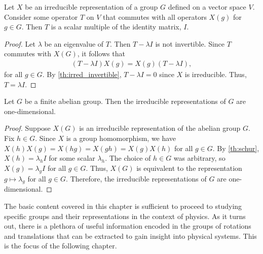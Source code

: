 \begin{lemma}\label{th:schur}
    Let $X$ be an irreducible representation of a group $G$ defined on a vector space $V$. Consider some operator $T$ on $V$ that commutes with all operators $X(g)$ for $g\in G$. Then $T$ is a scalar multiple of the identity matrix, $I$.
\end{lemma}
\begin{proof}
    Let $\lambda$ be an eigenvalue of $T$. Then $T-\lambda I$ is not invertible. Since $T$ commutes with $X(G)$, it follows that
    \begin{align}
        (T-\lambda I)X(g)=X(g)(T-\lambda I),
    \end{align}
    for all $g\in G$. By \cref{th:irred_invertible}, $T-\lambda I = 0$ since $X$ is irreducible. Thus, $T=\lambda I$.
\end{proof}


\begin{theorem}\label{cor:abelian_irred}
    Let $G$ be a finite abelian group. Then the irreducible representations of $G$ are one-dimensional.
\end{theorem}
\begin{proof}
    Suppose $X(G)$ is an irreducible representation of the abelian group $G$. Fix $h\in G$. Since $X$ is a group homomorphism, we have $X(h)X(g)=X(hg)=X(gh)=X(g)X(h)$ for all $g\in G$. By \cref{th:schur}, $X(h) = \lambda_h I$ for some scalar $\lambda_h$. The choice of $h\in G$ was arbitrary, so $X(g) = \lambda_g I$ for all $g\in G$. Thus, $X(G)$ is equivalent to the representation $g\mapsto \lambda_g$ for all $g\in G$. Therefore, the irreducible representations of $G$ are one-dimensional.
\end{proof}
The basic content covered in this chapter is sufficient to proceed to studying specific groups and their representations in the context of physics. As it turns out, there is a plethora of useful information encoded in the groups of rotations and translations that can be extracted to gain insight into physical systems. This is the focus of the following chapter.